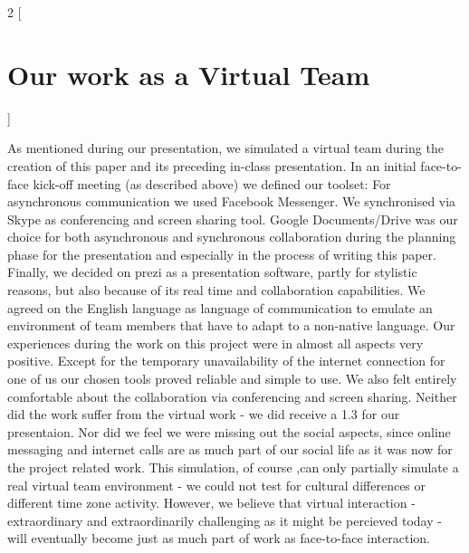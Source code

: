\begin{multicols}{2}
[\section{Our work as a Virtual Team}]

As mentioned during our presentation, we simulated a virtual team during the creation of this paper and its preceding in-class presentation. In an initial face-to-face kick-off meeting (as described above) we defined our toolset: For asynchronous communication we used Facebook Messenger. We synchronised via Skype as conferencing and screen sharing tool. Google Documents/Drive was our choice for both asynchronous and synchronous collaboration during the planning phase for the presentation and especially in the process of writing this paper. Finally, we decided on prezi as a presentation software, partly for stylistic reasons, but also because of its real time and collaboration capabilities. We agreed on the English language as language of communication to emulate an environment of team members that have to adapt to a non-native language.
Our experiences during the work on this project were in almost all aspects very positive. Except for the temporary unavailability of the internet connection for one of us our chosen tools proved reliable and simple to use. We also felt entirely comfortable about the collaboration via conferencing and screen sharing. Neither did the work suffer from the virtual work - we did receive a 1.3 for our presentaion. Nor did we feel we were missing out the social aspects, since online messaging and internet calls are as much part of our social life as it was now for the project related work.
This simulation, of course ,can only partially simulate a real virtual team environment - we could not test for cultural differences or different time zone activity. However, we believe that virtual interaction - extraordinary and extraordinarily challenging as it might be percieved today - will eventually become just as much part of work as face-to-face interaction.

\end{multicols}